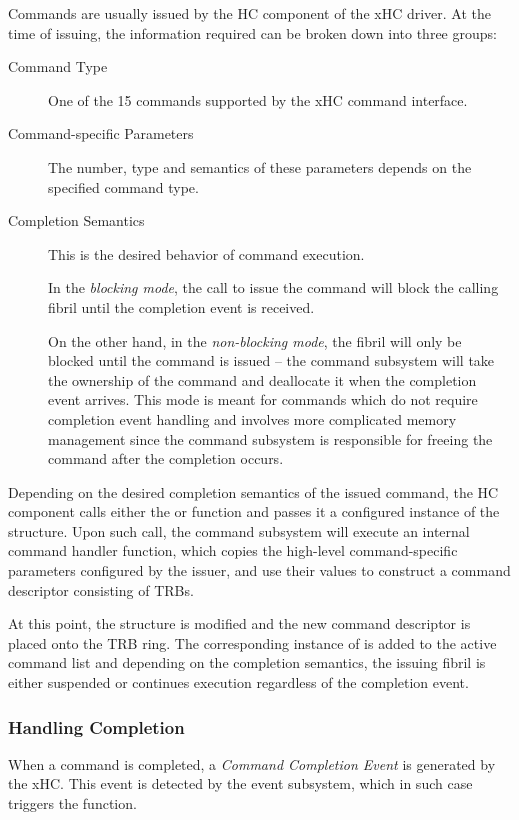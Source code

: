Commands are usually issued by the HC component of the xHC driver. At the time
of issuing, the information required can be broken down into three groups:
%
\begin{description}
	\item[Command Type]
		One of the 15 commands supported by the xHC command interface.
	\item[Command-specific Parameters]
		The number, type and semantics of these parameters depends on the
		specified command type.
	\item[Completion Semantics]
		This is the desired behavior of command execution.

		In the \textit{blocking mode}, the call to issue the command will block
		the calling fibril until the completion event is received.

		On the other hand, in the \textit{non-blocking mode}, the fibril will
		only be blocked until the command is issued -- the command subsystem
		will take the ownership of the command and deallocate it when the
		completion event arrives. This mode is meant for commands which do not
		require completion event handling and involves more complicated memory
		management since the command subsystem is responsible for freeing the
		command after the completion occurs.
\end{description}

Depending on the desired completion semantics of the issued command, the HC
component calls either the  or 
function and passes it a configured instance of the  structure.
Upon such call, the command subsystem will execute an internal command handler
function, which copies the high-level command-specific parameters configured by
the issuer, and use their values to construct a command descriptor consisting of
TRBs.

At this point, the  structure is modified and the new
command descriptor is placed onto the TRB ring. The corresponding instance of
 is added to the active command list and depending on the
completion semantics, the issuing fibril is either suspended or continues
execution regardless of the completion event.


\subsubsection{Handling Completion}

When a command is completed, a \textit{Command Completion Event} is generated by
the xHC. This event is detected by the event subsystem, which in such case
triggers the  function.


